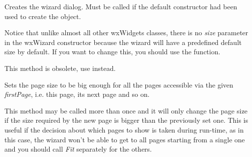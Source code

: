 



\label{wxwizardcreate}


Creates the wizard dialog. Must be called if the default constructor had been
used to create the object.

Notice that unlike almost all other wxWidgets classes, there is no {\it size} 
parameter in the wxWizard constructor because the wizard will have a predefined
default size by default. If you want to change this, you should use the 
 function.









\label{wxwizardfittopage}


This method is obsolete, use
 instead.

Sets the page size to be big enough for all the pages accessible via the
given {\it firstPage}, i.e. this page, its next page and so on.

This method may be called more than once and it will only change the page size
if the size required by the new page is bigger than the previously set one.
This is useful if the decision about which pages to show is taken during
run-time, as in this case, the wizard won't be able to get to all pages starting
from a single one and you should call {\it Fit} separately for the others.


